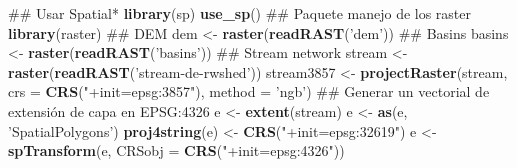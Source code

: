 \documentclass[11pt,]{article}
\newenvironment{Shaded}{\begin{snugshade}}{\end{snugshade}}
\newcommand{\KeywordTok}[1]{\textcolor[rgb]{0.13,0.29,0.53}{\textbf{#1}}}
\newcommand{\DataTypeTok}[1]{\textcolor[rgb]{0.13,0.29,0.53}{#1}}
\newcommand{\StringTok}[1]{\textcolor[rgb]{0.31,0.60,0.02}{#1}}
\newcommand{\NormalTok}[1]{#1}
\begin{document}
\begin{Shaded}
\begin{Highlighting}[]
\NormalTok{## Usar Spatial*}
\KeywordTok{library}\NormalTok{(sp)}
\KeywordTok{use_sp}\NormalTok{()}
\NormalTok{## Paquete manejo de los raster}
\KeywordTok{library}\NormalTok{(raster)}
\NormalTok{## DEM}
\NormalTok{dem <-}\StringTok{ }\KeywordTok{raster}\NormalTok{(}\KeywordTok{readRAST}\NormalTok{(}\StringTok{'dem'}\NormalTok{))}
\NormalTok{## Basins}
\NormalTok{basins <-}\StringTok{ }\KeywordTok{raster}\NormalTok{(}\KeywordTok{readRAST}\NormalTok{(}\StringTok{'basins'}\NormalTok{))}
\NormalTok{## Stream network}
\NormalTok{stream <-}\StringTok{ }\KeywordTok{raster}\NormalTok{(}\KeywordTok{readRAST}\NormalTok{(}\StringTok{'stream-de-rwshed'}\NormalTok{))}
\NormalTok{stream3857 <-}\StringTok{ }\KeywordTok{projectRaster}\NormalTok{(stream, }\DataTypeTok{crs =} \KeywordTok{CRS}\NormalTok{(}\StringTok{"+init=epsg:3857"}\NormalTok{), }\DataTypeTok{method =} \StringTok{'ngb'}\NormalTok{)}
\NormalTok{## Generar un vectorial de extensión de capa en EPSG:4326}
\NormalTok{e <-}\StringTok{ }\KeywordTok{extent}\NormalTok{(stream)}
\NormalTok{e <-}\StringTok{ }\KeywordTok{as}\NormalTok{(e, }\StringTok{'SpatialPolygons'}\NormalTok{)}
\KeywordTok{proj4string}\NormalTok{(e) <-}\StringTok{ }\KeywordTok{CRS}\NormalTok{(}\StringTok{"+init=epsg:32619"}\NormalTok{)}
\NormalTok{e <-}\StringTok{ }\KeywordTok{spTransform}\NormalTok{(e, }\DataTypeTok{CRSobj =} \KeywordTok{CRS}\NormalTok{(}\StringTok{"+init=epsg:4326"}\NormalTok{))}


\end{Highlighting}
\end{Shaded}
\end{document}
